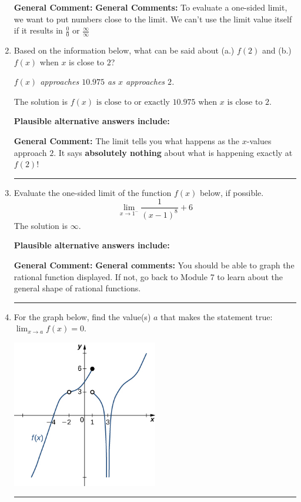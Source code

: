 \documentclass{extbook}[14pt]
\newcommand{\litem}[1]{\item #1

\rule{\textwidth}{0.4pt}}
\begin{document}
\begin{enumerate}
{\textbf{General Comment:} \textbf{General Comments:} To evaluate a one-sided limit, we want to put numbers close to the limit. We can't use the limit value itself if it results in $\frac{0}{0}$ or $\frac{\infty}{\infty}$
}
\litem{
Based on the information below, what can be said about (a.) $f(2)$ and (b.) $f(x)$ when $x$ is close to $2$?

\begin{center}
    \textit{ $f(x)$ approaches $10.975$ as $x$ approaches $2$. }
\end{center}
The solution is \( f(x) \text{ is close to or exactly } 10.975 \text{ when } x \text{ is close to } 2 \).\begin{enumerate}[label=\Alph*.]
\textbf{Plausible alternative answers include:}




\end{enumerate}

\textbf{General Comment:} The limit tells you what happens as the $x$-values approach $2$. It says \textbf{absolutely nothing} about what is happening exactly at $f(2)$!
}
\litem{
Evaluate the one-sided limit of the function $f(x)$ below, if possible.
\[ \lim_{x \rightarrow 1^-} \frac{1}{(x-1)^8}+6 \]The solution is \( \infty \).\begin{enumerate}[label=\Alph*.]
\textbf{Plausible alternative answers include:}




\end{enumerate}

\textbf{General Comment:} \textbf{General comments:} You should be able to graph the rational function displayed. If not, go back to Module 7 to learn about the general shape of rational functions.
}
\litem{
For the graph below, find the value(s) $a$ that makes the statement true: $ \displaystyle \lim_{x \rightarrow a} f(x) = 0$.

\begin{center}
    \includegraphics[width=0.5\textwidth]{../Figures/evaluateLimitGraphicallyCopyA.png}
\end{center}


}
\end{enumerate}
\end{document}
